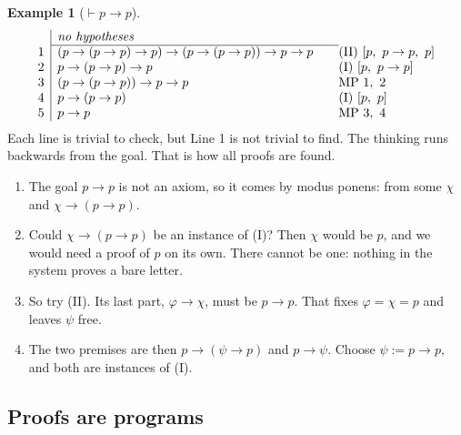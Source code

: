\documentclass[a4paper, 11pt]{article}
\theoremstyle{definition}
\newtheorem{example}[definition]{Example}
\begin{document}
\begin{example}[$\vdash p \to p$]
    \[
        \begin{array}{r|l@{\qquad}l}
        & \textit{no hypotheses} \\ \cline{2-2}
        1 & (p \to (p \to p) \to p) \to (p \to (p \to p)) \to p \to p & \text{(II) } [p,\ p \to p,\ p] \\
        2 & p \to (p \to p) \to p & \text{(I) } [p,\ p \to p] \\
        3 & (p \to (p \to p)) \to p \to p & \text{MP } 1,\ 2 \\
        4 & p \to (p \to p) & \text{(I) } [p,\ p] \\
        5 & p \to p & \text{MP } 3,\ 4
        \end{array}
    \] 
    Each line is trivial to check, but Line 1 is not trivial to find. The thinking runs backwards from the goal. That is how all proofs are found.
    \begin{enumerate}
        \item The goal $p \to p$ is not an axiom, so it comes by modus ponens: from some $\chi$ and $\chi \to (p \to p)$.
        \item Could $\chi \to (p \to p)$ be an instance of (I)? Then $\chi$ would be $p$, and we would need a proof of $p$ on its own. There cannot be one: nothing in the system proves a bare letter. 
        \item So try (II). Its last part, $\varphi \to \chi$, must be $p \to p$. That fixes $\varphi = \chi = p$ and leaves $\psi$ free.
        \item The two premises are then $p \to (\psi \to p)$ and $p \to \psi$. Choose $\psi := p \to p$, and both are instances of (I).
    \end{enumerate} 
\end{example}

\newpage

\subsection{Proofs are programs}
\end{document}
